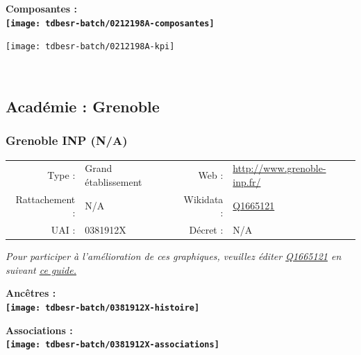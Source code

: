 \documentclass[12pt,french,]{article}
\begin{document}
\begin{center} \bf Composantes : \\  
\texttt{[image: tdbesr-batch/0212198A-composantes]} \end{center}

\begin{center}\texttt{[image: tdbesr-batch/0212198A-kpi]} \end{center}\checkoddpage

\ifoddpage ~\newpage \fi   

\hypertarget{acaduxe9mie-grenoble-1}{%
\subsection{Académie : Grenoble}\label{acaduxe9mie-grenoble-1}}

\hypertarget{grenoble-inp-na}{%
\subsubsection{Grenoble INP (N/A)}\label{grenoble-inp-na}}

\begin{tabular*}{\textwidth}{rp{5cm}rl}  
\hline  
Type : & Grand établissement & Web : &\href{http://www.grenoble-inp.fr/}{http://www.grenoble-inp.fr/} \\  
Rattachement : & N/A & Wikidata : & \href{https://www.wikidata.org/entity/Q1665121}{Q1665121} \\  
UAI : & 0381912X & Décret : & N/A \\  
\hline  
\end{tabular*}

\textit{\scriptsize Pour participer à l'amélioration de ces graphiques, veuillez éditer  \href{https://www.wikidata.org/entity/Q1665121}{Q1665121}  en suivant \href{https://github.com/cpesr/wikidataESR/blob/master/Rmd/wikidataESR.md}{ce guide.}}

\vspace{1cm}  
\begin{minipage}[b]{0.50\textwidth}\begin{center} \bf Ancêtres : \\  
\texttt{[image: tdbesr-batch/0381912X-histoire]} \end{center}\end{minipage}\begin{minipage}[b]{0.50\textwidth}\begin{center} \bf Associations : \\  
\texttt{[image: tdbesr-batch/0381912X-associations]} \end{center}\end{minipage}
\end{document}
